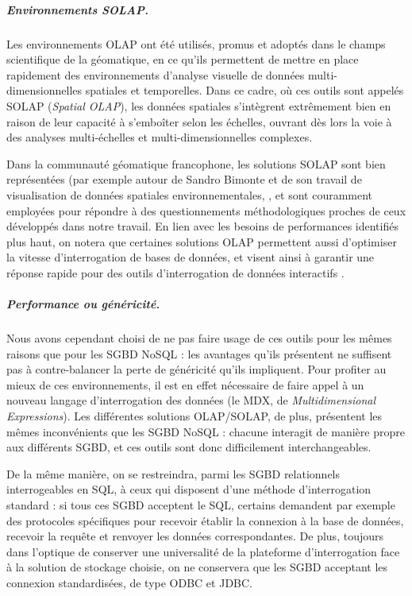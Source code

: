 \subparagraph{Environnements SOLAP.}
Les environnements OLAP ont été utilisés, promus et adoptés dans le champs scientifique de la géomatique, en ce qu'ils permettent de mettre en place rapidement des environnements d'analyse visuelle de données multi-dimensionnelles spatiales et temporelles.
Dans ce cadre, où ces outils sont appelés \og SOLAP\fg{} (\textit{Spatial OLAP}), les données spatiales s'intègrent extrêmement bien en raison de leur capacité à s'emboîter selon les échelles, ouvrant dès lors la voie à des analyses multi-échelles et multi-dimensionnelles complexes.

Dans la communauté géomatique francophone, les solutions SOLAP sont bien représentées (par exemple autour de Sandro Bimonte et de son travail de visualisation de données spatiales environnementales, \autocite{bimonte_integration_2007, bimonte_towards_2005, zaamoune_new_2013}, et sont couramment employées pour répondre à des questionnements méthodologiques proches de ceux développés dans notre travail.
En lien avec les besoins de performances identifiés plus haut, on notera que certaines solutions OLAP permettent aussi d'optimiser la vitesse d'interrogation de bases de données, et visent ainsi à garantir une réponse rapide pour des outils d'interrogation de données interactifs \autocite{zeng_iolap_2016}.

\subparagraph{Performance ou généricité.}
Nous avons cependant choisi de ne pas faire usage de ces outils pour les mêmes raisons que pour les SGBD NoSQL : les avantages qu'ils présentent ne suffisent pas à contre-balancer la perte de généricité qu'ils impliquent.
Pour profiter au mieux de ces environnements, il est en effet nécessaire de faire appel à un nouveau langage d'interrogation des données (le \og MDX\fg{}, de \og \textit{Multidimensional Expressions}\fg{}).
Les différentes solutions OLAP/SOLAP, de plus, présentent les mêmes inconvénients que les SGBD NoSQL : chacune interagit de manière propre aux différents SGBD, et ces outils sont donc difficilement interchangeables.

De la même manière, on se restreindra, parmi les SGBD relationnels interrogeables en SQL, à ceux qui disposent d'une méthode d'interrogation standard : si tous ces SGBD acceptent le SQL, certains demandent par exemple des protocoles spécifiques pour recevoir établir la connexion à la base de données, recevoir la requête et renvoyer les données correspondantes.
De plus, toujours dans l'optique de conserver une universalité de la plateforme d'interrogation face à la solution de stockage choisie, on ne conservera que les SGBD acceptant les connexion standardisées, de type ODBC et JDBC.

